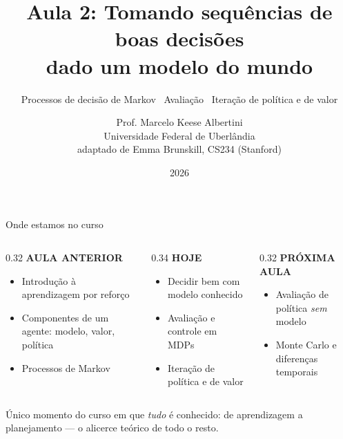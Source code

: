 \documentclass[aspectratio=169, 11pt]{beamer}
\title[Aula 2 — Decisões com modelo]{Aula 2: Tomando sequências de boas decisões\\ dado um modelo do mundo}
\subtitle[Aprendizagem por Reforço]{Processos de decisão de Markov \textbullet\ Avaliação \textbullet\ Iteração de política e de valor}
\author[Marcelo K. Albertini]{Prof. Marcelo Keese Albertini \\
  \footnotesize Universidade Federal de Uberlândia \\
  \footnotesize adaptado de Emma Brunskill, CS234 (Stanford)}
\institute{Aprendizagem por Reforço \textbullet\ UFU}
\date{2026}
\begin{document}
\begin{frame}\titlepage\end{frame}

\begin{frame}{Onde estamos no curso}
  \begin{columns}[T]
    \begin{column}{0.32\textwidth}
      {\color{rlCinza}\small\bfseries AULA ANTERIOR}\\[0.3em]
      \begin{itemize}\setlength{\itemsep}{0.3ex}
        \item Introdução à aprendizagem por reforço
        \item Componentes de um agente: \alert{modelo}, \alert{valor}, \alert{política}
        \item Processos de Markov
      \end{itemize}
    \end{column}
    \begin{column}{0.34\textwidth}
      {\color{rlLaranja}\small\bfseries HOJE}\\[0.3em]
      \begin{itemize}\setlength{\itemsep}{0.3ex}
        \item Decidir bem com modelo conhecido
        \item Avaliação e controle em MDPs
        \item Iteração de política e de valor
      \end{itemize}
    \end{column}
    \begin{column}{0.32\textwidth}
      {\color{rlCinza}\small\bfseries PRÓXIMA AULA}\\[0.3em]
      \begin{itemize}\setlength{\itemsep}{0.3ex}
        \item Avaliação de política \emph{sem} modelo
        \item Monte Carlo e diferenças temporais
      \end{itemize}
    \end{column}
  \end{columns}
  \vfill
  \begin{ideiabox}
    Único momento do curso em que \emph{tudo} é conhecido: de aprendizagem a
    \alert{planejamento} --- o alicerce teórico de todo o resto.
  \end{ideiabox}
\end{frame}
\end{document}
